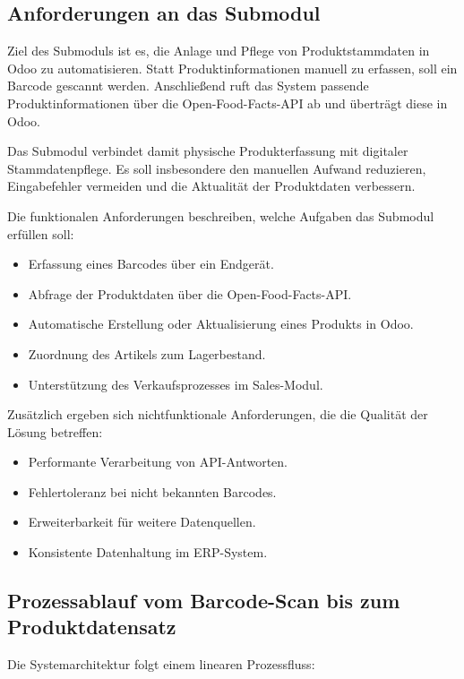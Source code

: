 \documentclass[12pt,a4paper]{article}
\begin{document}
\subsection{Anforderungen an das Submodul}

Ziel des Submoduls ist es, die Anlage und Pflege von Produktstammdaten in Odoo zu automatisieren. Statt Produktinformationen manuell zu erfassen, soll ein Barcode gescannt werden. Anschließend ruft das System passende Produktinformationen über die Open-Food-Facts-API ab und überträgt diese in Odoo.

Das Submodul verbindet damit physische Produkterfassung mit digitaler Stammdatenpflege. Es soll insbesondere den manuellen Aufwand reduzieren, Eingabefehler vermeiden und die Aktualität der Produktdaten verbessern.

Die funktionalen Anforderungen beschreiben, welche Aufgaben das Submodul erfüllen soll:

\begin{itemize}
    \item Erfassung eines Barcodes über ein Endgerät.
    \item Abfrage der Produktdaten über die Open-Food-Facts-API.
    \item Automatische Erstellung oder Aktualisierung eines Produkts in Odoo.
    \item Zuordnung des Artikels zum Lagerbestand.
    \item Unterstützung des Verkaufsprozesses im Sales-Modul.
\end{itemize}

Zusätzlich ergeben sich nichtfunktionale Anforderungen, die die Qualität der Lösung betreffen:

\begin{itemize}
    \item Performante Verarbeitung von API-Antworten.
    \item Fehlertoleranz bei nicht bekannten Barcodes.
    \item Erweiterbarkeit für weitere Datenquellen.
    \item Konsistente Datenhaltung im ERP-System.
\end{itemize}

\subsection{Prozessablauf vom Barcode-Scan bis zum Produktdatensatz}

Die Systemarchitektur folgt einem linearen Prozessfluss:
\end{document}
